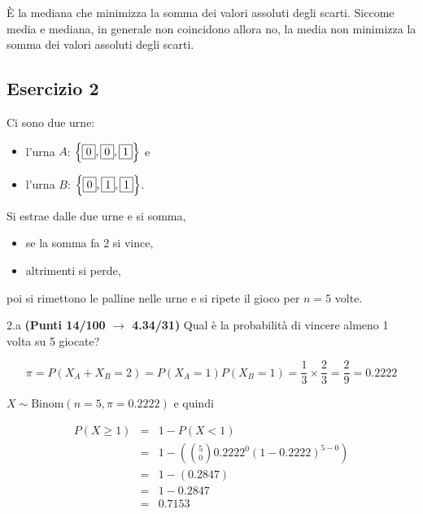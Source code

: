 \documentclass[
  11pt,
]{book}
\providecommand{\tightlist}{%
  \setlength{\itemsep}{0pt}\setlength{\parskip}{0pt}}
\theoremstyle{mytheoremstyle}
\theoremstyle{mydefstyle}
\newenvironment{sol}
  {
  \begin{tcolorbox}[enhanced,breakable,arc=0.1mm,boxrule=1pt,colback=white,colframe=iblue,
  title=\bf \fontfamily{lmss}\selectfont \hspace{.5 cm} Soluzione,drop fuzzy shadow]

}{
\end{tcolorbox}
  }
\begin{document}
\begin{sol}
È la mediana che minimizza la somma dei valori assoluti degli scarti. Siccome media e mediana, in generale non coincidono allora no, la media non minimizza la somma dei valori assoluti degli scarti.

\end{sol}

\subsection{Esercizio 2}\label{esercizio-2-8}

Ci sono due urne:

\begin{itemize}
\tightlist
\item
  l'urna \(A\): \(\left\{\fbox{0},\fbox{0},\fbox{1}\right\}\) e
\item
  l'urna \(B\): \(\left\{\fbox{0},\fbox{1},\fbox{1}\right\}\).
\end{itemize}

Si estrae dalle due urne e si somma,

\begin{itemize}
\tightlist
\item
  se la somma fa 2 si vince,
\item
  altrimenti si perde,
\end{itemize}

poi si rimettono le palline nelle urne e si ripete il gioco per \(n=5\) volte.

2.a \textbf{(Punti 14/100 \(\rightarrow\) 4.34/31)} Qual è la probabilità di vincere almeno 1 volta su 5 giocate?

\begin{sol}
\[
\pi=P(X_A+X_B=2)=P(X_A=1)P(X_B=1)=\frac 13\times\frac23=\frac29=0.2222
\]

\(X\sim\text{Binom}(n=5,\pi=0.2222)\) e quindi

\normalsize 
\begin{eqnarray*}
      P( X \geq 1 ) &=& 1-P( X < 1 ) \\                 &=& 1-\left( \binom{ 5 }{ 0 } 0.2222 ^{ 0 }(1- 0.2222 )^{ 5 - 0 } \right)\\                 &=& 1-( 0.2847 )\\                 &=& 1- 0.2847 \\                 &=&   0.7153 
   \end{eqnarray*}
\normalsize 

\end{sol}
\end{document}

